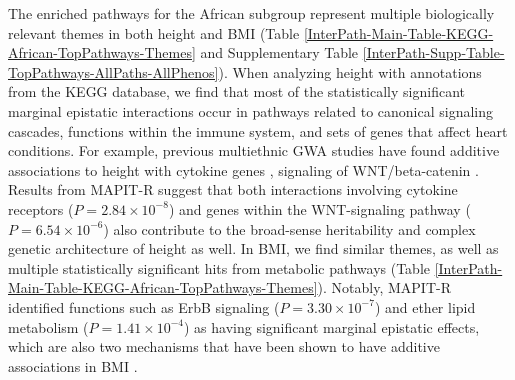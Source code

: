 \documentclass[10pt,a4paper]{article}
\begin{document}
The enriched pathways for the African subgroup represent multiple biologically relevant themes in both height and BMI (Table \ref{InterPath-Main-Table-KEGG-African-TopPathways-Themes} and Supplementary Table \ref{InterPath-Supp-Table-TopPathways-AllPaths-AllPhenos}). When analyzing height with annotations from the KEGG database, we find that most of the statistically significant marginal epistatic interactions occur in pathways related to canonical signaling cascades, functions within the immune system, and sets of genes that affect heart conditions. For example, previous multiethnic GWA studies have found additive associations to height with cytokine genes \cite{Marouli:2017aa}, signaling of WNT/beta-catenin \cite{Wood:2014aa}. Results from MAPIT-R suggest that both interactions involving cytokine receptors ($P = 2.84\times 10^{-8}$) and genes within the WNT-signaling pathway ($P = 6.54\times 10^{-6}$) also contribute to the broad-sense heritability and complex genetic architecture of height as well. In BMI, we find similar themes, as well as multiple statistically significant hits from metabolic pathways (Table \ref{InterPath-Main-Table-KEGG-African-TopPathways-Themes}). Notably, MAPIT-R identified functions such as ErbB signaling ($P = 3.30\times 10^{-7}$) and ether lipid metabolism ($P = 1.41\times 10^{-4}$) as having significant marginal epistatic effects, which are also two mechanisms that have been shown to have additive associations in BMI \cite{Locke2015,Salinas:2016aa,Jha:2018aa}. 
\end{document}
